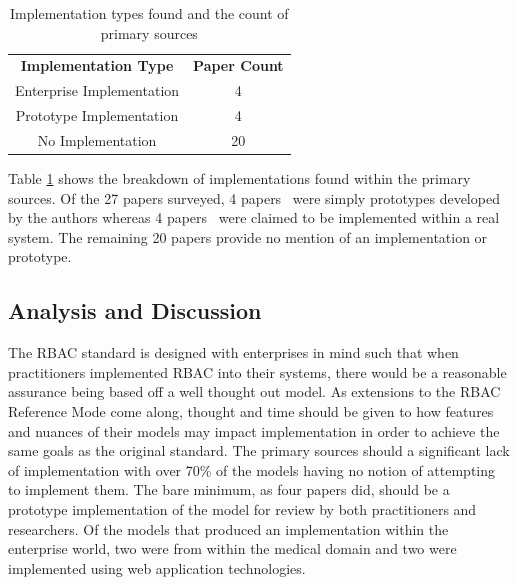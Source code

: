 \begin{table}
\centering
\caption{Implementation types found and the count of primary sources}
\begin{tabular}{ | c | c | }
\cline{1-2}

\textbf{Implementation Type} & \textbf{Paper Count} \\ \cline{1-2}
Enterprise Implementation & 4 \\ \cline{1-2}
Prototype Implementation & 4 \\ \cline{1-2}
No Implementation & 20 \\

\cline{1-2}
\end{tabular}
\label{tab:implementations}
\end{table}

Table \ref{tab:implementations} shows the breakdown of implementations found within the primary sources.
Of the 27 papers surveyed, 4 papers~\cite{zhou2007team,bao08:role, cholewka00:acontext-sensitive,huang06:pervasive} were simply prototypes developed by the authors whereas 4 papers~\cite{jian2008extended, aich09:role, yao2008task, motta03:contextual} were claimed to be implemented within a real
system. The remaining 20 papers provide no
mention of an implementation or prototype.  


\subsection{Analysis and Discussion}

The RBAC standard is designed with enterprises in mind such that when practitioners implemented RBAC into their systems,
there would be a reasonable assurance being based off a well thought out model.  As extensions to the RBAC Reference Mode
come along, thought and time should be given to how features and nuances of their models may impact implementation
in order to achieve the same goals as the original standard.  The primary sources should a significant lack of implementation
with over 70\% of the models having no notion of attempting to implement them.  The bare minimum, as four papers did, should be
a prototype implementation of the model for review by both practitioners and researchers. Of the models that produced an 
implementation within the enterprise world, two were from within the medical domain and two were implemented using web application technologies.  

